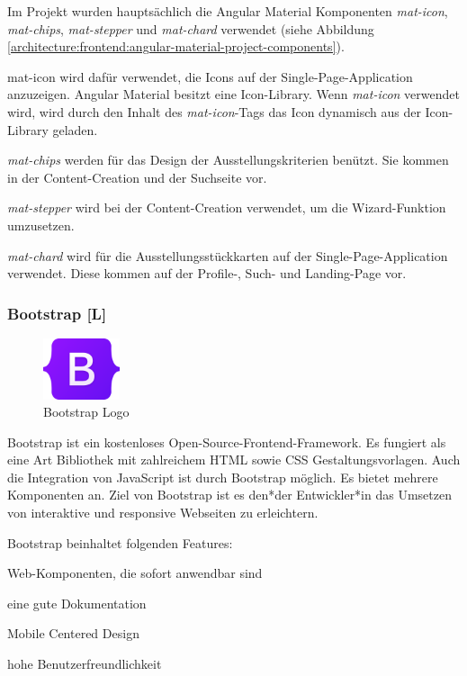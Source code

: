 Im Projekt wurden hauptsächlich die Angular Material Komponenten \emph{mat-icon}, \emph{mat-chips}, \emph{mat-stepper} und \emph{mat-chard} verwendet (siehe Abbildung \ref{architecture:frontend:angular-material-project-components}).

{mat-icon} wird dafür verwendet, die Icons auf der Single-Page-Application anzuzeigen. Angular Material besitzt eine Icon-Library. Wenn \emph{mat-icon} verwendet wird, wird durch den Inhalt des \emph{mat-icon}-Tags das Icon dynamisch aus der Icon-Library geladen.

\emph{mat-chips} werden für das Design der Ausstellungskriterien benützt. Sie kommen in der Content-Creation und der Suchseite vor.

\emph{mat-stepper} wird bei der Content-Creation verwendet, um die Wizard-Funktion umzusetzen.

\emph{mat-chard} wird für die Ausstellungsstückkarten auf der Single-Page-Application verwendet. Diese kommen auf der Profile-, Such- und Landing-Page vor.

\subsubsection{Bootstrap [L]}
\begin{figure}
  \begin{center}
    \includegraphics[width=0.2\textwidth]{pics/Bootstrap_logo.png}
   \caption{Bootstrap Logo}
  \end{center}
\end{figure}
Bootstrap ist ein kostenloses Open-Source-Frontend-Framework. Es fungiert als eine Art Bibliothek mit zahlreichem HTML sowie CSS Gestaltungsvorlagen. Auch die Integration von JavaScript ist durch Bootstrap möglich. Es bietet mehrere Komponenten an. Ziel von Bootstrap ist es den*der Entwickler*in das Umsetzen von interaktive und responsive Webseiten zu erleichtern. \cite{BestCSSFrameworksin2022}

Bootstrap beinhaltet folgenden Features:  
\begin{compactitem}
    \item Web-Komponenten, die sofort anwendbar sind \cite{BestCSSFrameworksin2022} 
    \item eine gute Dokumentation \cite{BestCSSFrameworksin2022}
    \item Mobile Centered Design \cite{BestCSSFrameworksin2022}
    \item hohe Benutzerfreundlichkeit \cite{BestCSSFrameworksin2022}
\end{compactitem}

